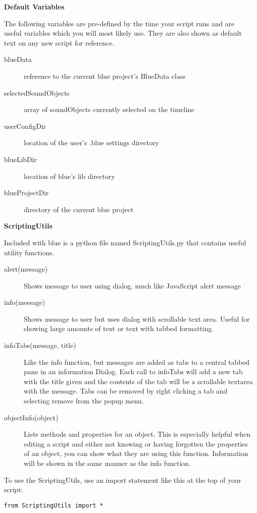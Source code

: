 \textbf{Default Variables}

The following variables are pre-defined by the time your script runs and
are useful variables which you will most likely use. They are also shown
as default text on any new script for reference.

\begin{description}
\item[blueData]
reference to the current blue project's BlueData class
\item[selectedSoundObjects]
array of soundObjects currently selected on the timeline
\item[userConfigDir]
location of the user's .blue settings directory
\item[blueLibDir]
location of blue's lib directory
\item[blueProjectDir]
directory of the current blue project
\end{description}

\textbf{ScriptingUtils}

Included with blue is a python file named ScriptingUtils.py that
contains useful utility functions.

\begin{description}
\item[alert(message)]
Shows message to user using dialog, much like JavaScript alert message
\item[info(message)]
Shows message to user but uses dialog with scrollable text area. Useful
for showing large amounts of text or text with tabbed formatting.
\item[infoTabs(message, title)]
Like the info function, but messages are added as tabs to a central
tabbed pane in an information Dialog. Each call to infoTabs will add a
new tab with the title given and the contents of the tab will be a
scrollable textarea with the message. Tabs can be removed by right
clicking a tab and selecting remove from the popup menu.
\item[objectInfo(object)]
Lists methods and properties for an object. This is especially helpful
when editing a script and either not knowing or having forgotten the
properties of an object, you can show what they are using this function.
Information will be shown in the same manner as the info function.
\end{description}

To use the ScriptingUtils, use an import statement like this at the top
of your script:

\begin{verbatim}
from ScriptingUtils import *
  
\end{verbatim}

